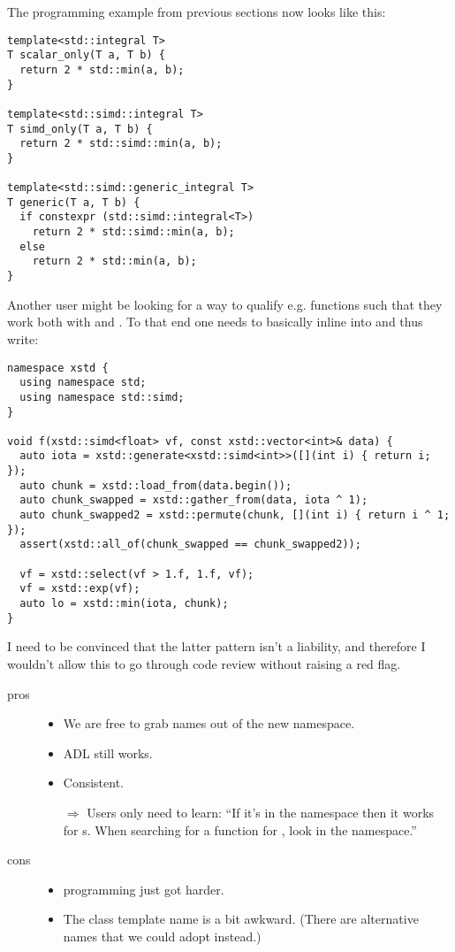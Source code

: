 The \simdgeneric programming example from previous sections now looks like
this:
\medskip\begin{lstlisting}[style=Vc]
template<std::integral T>
T scalar_only(T a, T b) {
  return 2 * std::min(a, b);
}

template<std::simd::integral T>
T simd_only(T a, T b) {
  return 2 * std::simd::min(a, b);
}

template<std::simd::generic_integral T>
T generic(T a, T b) {
  if constexpr (std::simd::integral<T>)
    return 2 * std::simd::min(a, b);
  else
    return 2 * std::min(a, b);
}
\end{lstlisting}

Another user might be looking for a way to qualify e.g. 
functions such that they work both with  and \simdT.
To that end one needs to basically inline \std{} into  and
thus write:
\medskip\begin{lstlisting}[style=Vc]
namespace xstd {
  using namespace std;
  using namespace std::simd;
}

void f(xstd::simd<float> vf, const xstd::vector<int>& data) {
  auto iota = xstd::generate<xstd::simd<int>>([](int i) { return i; });
  auto chunk = xstd::load_from(data.begin());
  auto chunk_swapped = xstd::gather_from(data, iota ^ 1);
  auto chunk_swapped2 = xstd::permute(chunk, [](int i) { return i ^ 1; });
  assert(xstd::all_of(chunk_swapped == chunk_swapped2));

  vf = xstd::select(vf > 1.f, 1.f, vf);
  vf = xstd::exp(vf);
  auto lo = xstd::min(iota, chunk);
}
\end{lstlisting}

I need to be convinced that the latter pattern isn't a liability, and
therefore I wouldn't allow this to go through code review without raising a
red flag.

\begin{description}
  \item[pros]
    \begin{itemize}
      \item We are free to grab names out of the new namespace.
      \item ADL still works.
      \item Consistent.
      \item[$\Rightarrow$] Users only need to learn: “If it's in the
        \std{} namespace then it works for s.
        When searching for a function for , look in the
        \std{} namespace.”
    \end{itemize}

  \item[cons]
    \begin{itemize}
      \item \simdgeneric programming just got harder.
      \item The class template name \std{} is a bit awkward.
        (There are alternative names that we could adopt instead.)
    \end{itemize}
\end{description}

